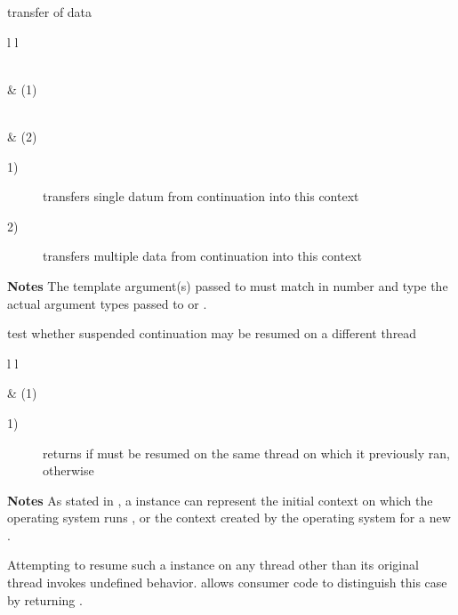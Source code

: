 
transfer of data\\

\begin{tabular}{ l l }
    \midrule

    \\
     & (1)\\

    \midrule

    \\
     & (2)\\

    \midrule
\end{tabular}

\begin{description}
    \item[1)] transfers single datum from continuation  into this context
    \item[2)] transfers multiple data from continuation  into this
              context
\end{description}

{\bfseries Notes}
\newline
The template argument(s) passed to  must match in number and
type the actual argument types passed to \call or \resume.


test whether suspended continuation may be resumed on a different thread\\

\begin{tabular}{ l l }
    \midrule

     & (1)\\

    \midrule
\end{tabular}

\begin{description}
    \item[1)] returns  if  must be resumed on the same
              thread on which it previously ran,  otherwise
\end{description}

{\bfseries Notes}
\newline
As stated in , a \cont instance can represent the initial
context on which the operating system runs \main, or the context created by
the operating system for a new .

Attempting to resume such a \cont instance on any thread other than its
original thread invokes undefined behavior.  allows
consumer code to distinguish this case by returning .
